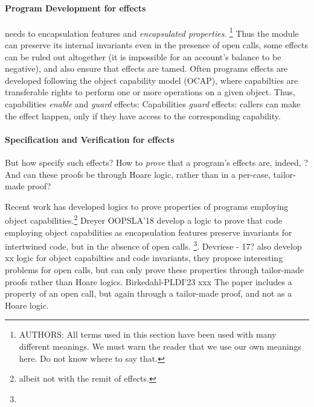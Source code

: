 \paragraph{Program Development for \tamed effects} %
needs to
 encapsulation features and \emph{encapsulated properties}.
\footnote{AUTHORS: All terms used in this section have been used with many different meanings. 
We must warn the reader that we use our own meanings here. 
Do not know where to say that.}
Thus the module can preserve its internal invariants  even in the presence of open calls,
some effects can be ruled out altogether (\eg it is impossible for an account's balance to be negative), and
also ensure that effects are tamed.
 Often  programs \taming effects are developed following the object capability model (OCAP)\cite{Miller}, where  
 capabilties are transferable rights to perform one or more operations on a given object.
Thus, capabilities \emph{enable} and  \emph{guard} effects:   
Capabilities \emph{guard} effects: callers can make the effect   happen, only if they have access to the corresponding capability.
 
 
\paragraph{Specification and Verification  for \tamed effects} But how specify such \tamed effects? How to \emph{prove} that a program's effects are, indeed, \tamed?
And can these proofs be  through Hoare logic, rather than in a per-case, tailor-made proof?
 
Recent work has developed logics to prove properties of programs employing object capabilities.\footnote{albeit not with the remit of   \tamed effects.}
Dreyer OOPSLA'18 develop a logic to prove that   code employing object capabilities as encapsulation features preserve invariants for intertwined code, but in the absence of open calls. 
 \footnote{}.
Devriese - 17? also develop xx logic for object capabilties and code invariants, they propose interesting problems for open calls, 
but can only prove these properties through tailor-made proofs rather than Hoare logics.
Birkedahl-PLDI'23 xxx The paper includes a property of an open call, but again through a tailor-made proof, and not as a Hoare logic.


